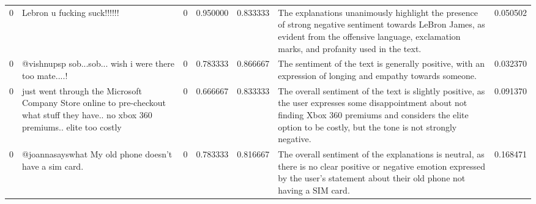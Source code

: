 \begin{tabular}{rlrrrlr}
0 & Lebron u fucking suck!!!!!!  & 0 & 0.950000 & 0.833333 & The explanations unanimously highlight the presence of strong negative sentiment towards LeBron James, as evident from the offensive language, exclamation marks, and profanity used in the text. & 0.050502 \\
0 & @vishnupsp sob...sob...  wish i were there too mate....! & 0 & 0.783333 & 0.866667 & The sentiment of the text is generally positive, with an expression of longing and empathy towards someone. & 0.032370 \\
0 & just went through the Microsoft Company Store online to pre-checkout what stuff they have.. no xbox 360 premiums.. elite too costly  & 0 & 0.666667 & 0.833333 & The overall sentiment of the text is slightly positive, as the user expresses some disappointment about not finding Xbox 360 premiums and considers the elite option to be costly, but the tone is not strongly negative. & 0.091370 \\
0 & @joannasayswhat  My old phone doesn't have a sim card. & 0 & 0.783333 & 0.816667 & The overall sentiment of the explanations is neutral, as there is no clear positive or negative emotion expressed by the user's statement about their old phone not having a SIM card. & 0.168471 \\
\bottomrule
\end{tabular}
